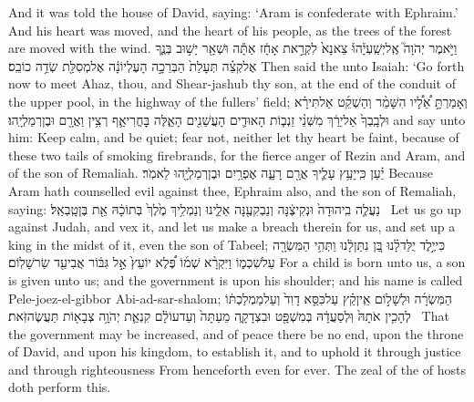 {And it was told the house of David, saying: ‘Aram is confederate with Ephraim.’ And his heart was moved, and the heart of his people, as the trees of the forest are moved with the wind.}
{וַיֹּ֣אמֶר יְהֹוָה֮ אֶֽל\maqqaf יְשַֽׁעְיָ֒הוּ֒ צֵא\maqqaf נָא֙ לִקְרַ֣את אָחָ֔ז אַתָּ֕ה וּשְׁאָ֖ר יָשׁ֣וּב בְּנֶ֑ךָ אֶל\maqqaf קְצֵ֗ה תְּעָלַת֙ הַבְּרֵכָ֣ה הָעֶלְיוֹנָ֔ה אֶל\maqqaf מְסִלַּ֖ת שְׂדֵ֥ה כוֹבֵֽס׃}
{Then said the \lord\space unto Isaiah: ‘Go forth now to meet Ahaz, thou, and Shear-jashub thy son, at the end of the conduit of the upper pool, in the highway of the fullers’ field;}
{וְאָמַרְתָּ֣ אֵ֠לָ֠יו הִשָּׁמֵ֨ר וְהַשְׁקֵ֜ט אַל\maqqaf תִּירָ֗א וּלְבָֽבְךָ֙ אַל\maqqaf יֵרַ֔ךְ מִשְּׁנֵ֨י זַנְב֧וֹת הָאוּדִ֛ים הָעֲשֵׁנִ֖ים הָאֵ֑לֶּה בׇּחֳרִי\maqqaf אַ֛ף רְצִ֥ין וַאֲרָ֖ם וּבֶן\maqqaf רְמַלְיָֽהוּ׃}
{and say unto him: Keep calm, and be quiet; fear not, neither let thy heart be faint, because of these two tails of smoking firebrands, for the fierce anger of Rezin and Aram, and of the son of Remaliah.}
{יַ֗עַן כִּֽי\maqqaf יָעַ֥ץ עָלֶ֛יךָ אֲרָ֖ם רָעָ֑ה אֶפְרַ֥יִם וּבֶן\maqqaf רְמַלְיָ֖הוּ לֵאמֹֽר׃}
{Because Aram hath counselled evil against thee, Ephraim also, and the son of Remaliah, saying:}
{נַעֲלֶ֤ה בִֽיהוּדָה֙ וּנְקִיצֶ֔נָּה וְנַבְקִעֶ֖נָּה אֵלֵ֑ינוּ וְנַמְלִ֥יךְ מֶ֙לֶךְ֙ בְּתוֹכָ֔הּ אֵ֖ת בֶּן\maqqaf טָֽבְאַֽל׃ \petucha }
{Let us go up against Judah, and vex it, and let us make a breach therein for us, and set up a king in the midst of it, even the son of Tabeel;}
\newperek
{}
\setcounter{chap}{9}
\setcounter{verse}{5}
{כִּי\maqqaf יֶ֣לֶד יֻלַּד\maqqaf לָ֗נוּ בֵּ֚ן נִתַּן\maqqaf לָ֔נוּ וַתְּהִ֥י הַמִּשְׂרָ֖ה עַל\maqqaf שִׁכְמ֑וֹ וַיִּקְרָ֨א שְׁמ֜וֹ פֶּ֠לֶא יוֹעֵץ֙ אֵ֣ל גִּבּ֔וֹר אֲבִי\maqqaf עַ֖ד שַׂר\maqqaf שָׁלֽוֹם׃}
{For a child is born unto us, a son is given unto us; and the government is upon his shoulder; and his name is called Pele-joez-el-gibbor Abi-ad-sar-shalom;}
{ הַמִּשְׂרָ֜ה וּלְשָׁל֣וֹם אֵֽין\maqqaf קֵ֗ץ עַל\maqqaf כִּסֵּ֤א דָוִד֙ וְעַל\maqqaf מַמְלַכְתּ֔וֹ לְהָכִ֤ין אֹתָהּ֙ וּֽלְסַעֲדָ֔הּ בְּמִשְׁפָּ֖ט וּבִצְדָקָ֑ה מֵעַתָּה֙ וְעַד\maqqaf עוֹלָ֔ם קִנְאַ֛ת יְהֹוָ֥ה צְבָא֖וֹת תַּעֲשֶׂה\maqqaf זֹּֽאת׃ \petucha }
{That the government may be increased, and of peace there be no end, upon the throne of David, and upon his kingdom, to establish it, and to uphold it through justice and through righteousness From henceforth even for ever. The zeal of the \lord\space of hosts doth perform this.}
